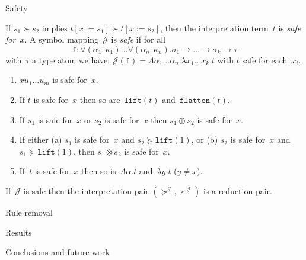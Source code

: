 \documentclass[10pt,presentation,color=names]{beamer}
\newcommand{\arrtype}{\rightarrow}
\newcommand{\subst}[2]{#1:=#2}
\newcommand{\abs}[2]{\lambda #1.#2}
\newcommand{\tabs}[2]{\Lambda #1.#2}
\newcommand{\flatten}{\mathtt{flatten}}
\newcommand{\lift}{\mathtt{lift}}
\newcommand{\Termmap}{\mathcal{J}}
\newcommand{\succinterpret}{\succ^{\Termmap}}
\newcommand{\succeqinterpret}{\succeq^{\Termmap}}
\begin{document}
\begin{frame}{Safety}
  \begin{definition}
    If $s_1 \succ s_2$ implies $t[\subst{x}{s_1}] \succ
    t[\subst{x}{s_2}]$, then the interpretation term~$t$ is \emph{safe
      for~$x$}. A symbol mapping~$\Termmap$ is \emph{safe} if for all
    \[
    \mathtt{f} : \forall (\alpha_1 : \kappa_1) \ldots \forall
    (\alpha_n : \kappa_n) . \sigma_1 \arrtype \ldots \arrtype \sigma_k
    \arrtype \tau
    \]
    with~$\tau$ a type atom we have: $\Termmap(\mathtt{f}) =
    \tabs{\alpha_1 \dots \alpha_n}{\abs{x_1 \dots x_k}{t}}$ with $t$
    safe for each~$x_i$.
  \end{definition}

  \pause

  \begin{enumerate}
  \item $x u_1 \ldots u_m$ is safe for~$x$.
  \item If $t$ is safe for~$x$ then so are~$\lift(t)$
    and~$\flatten(t)$.
  \item If $s_1$ is safe for~$x$ or $s_2$ is safe for~$x$ then $s_1
    \oplus s_2$ is safe for~$x$.
  \item If either
      (a)
      $s_1$ is safe for~$x$ and $s_2 \succeq \lift(1)$, or
      (b)
      $s_2$ is safe for~$x$ and $s_1 \succeq \lift(1)$,
    then $s_1 \otimes s_2$ is safe for~$x$.
  \item If~$t$ is safe for~$x$ then so is~$\tabs{\alpha}{t}$
    and~$\abs{y}{t}$ ($y \ne x$).
  \end{enumerate}

  \pause

  \begin{theorem}
    If~$\Termmap$ is safe then the interpretation pair
    $(\succeqinterpret,\succinterpret)$ is a reduction pair.
  \end{theorem}
\end{frame}

\begin{frame}{Rule removal}
\end{frame}

\begin{frame}{Results}
\end{frame}

\begin{frame}{Conclusions and future work}
\end{frame}
\end{document}
